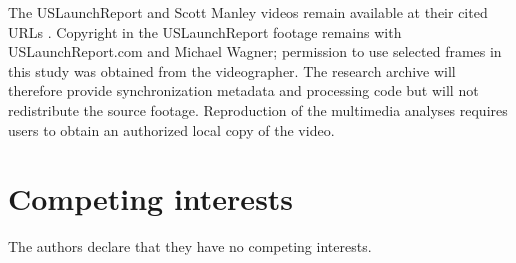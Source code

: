 \documentclass[]{seismica}
\begin{document}
The USLaunchReport and Scott Manley videos remain available at their cited URLs \citep{uslaunchreport_amos6_video_2016,manley_spacex_explosion_2016}. Copyright in the USLaunchReport footage remains with USLaunchReport.com and Michael Wagner; permission to use selected frames in this study was obtained from the videographer. The research archive will therefore provide synchronization metadata and processing code but will not redistribute the source footage. Reproduction of the multimedia analyses requires users to obtain an authorized local copy of the video.

\section*{Competing interests}

The authors declare that they have no competing interests.


\end{document}
